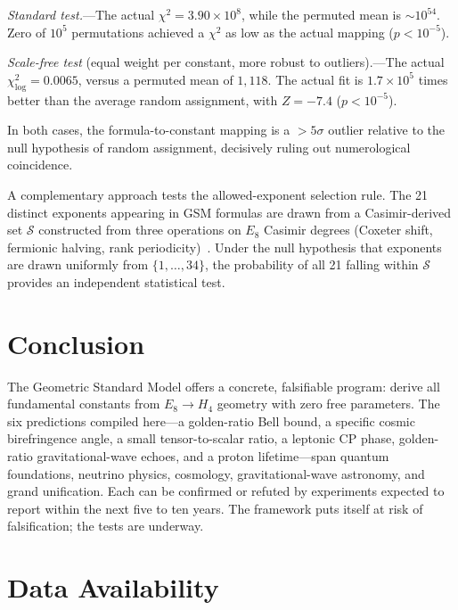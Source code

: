 \documentclass[aps,prl,twocolumn,superscriptaddress,nofootinbib]{revtex4-2}
\begin{document}
\emph{Standard test.}---The actual $\chi^2 = 3.90 \times 10^8$, while the
permuted mean is $\sim 10^{54}$.  Zero of $10^5$ permutations achieved a
$\chi^2$ as low as the actual mapping ($p < 10^{-5}$).

\emph{Scale-free test} (equal weight per constant, more robust to
outliers).---The actual $\chi^2_\text{log} = 0.0065$, versus a permuted
mean of $1{,}118$.  The actual fit is $1.7 \times 10^5$ times better
than the average random assignment, with $Z = -7.4$ ($p < 10^{-5}$).

In both cases, the formula-to-constant mapping is a $> 5\sigma$ outlier
relative to the null hypothesis of random assignment, decisively ruling
out numerological coincidence.

A complementary approach tests the allowed-exponent selection rule.
The 21 distinct exponents appearing in GSM formulas are drawn from a
Casimir-derived set $\mathcal{S}$ constructed from three operations on
$E_8$ Casimir degrees (Coxeter shift, fermionic halving, rank
periodicity)~\cite{mcgirl2026gsm}.  Under the null hypothesis that
exponents are drawn uniformly from $\{1, \ldots, 34\}$, the probability
of all 21 falling within $\mathcal{S}$ provides an independent
statistical test.

\section{Conclusion}

The Geometric Standard Model offers a concrete, falsifiable program:
derive all fundamental constants from $E_8 \to H_4$ geometry with zero
free parameters.  The six predictions compiled here---a golden-ratio Bell
bound, a specific cosmic birefringence angle, a small tensor-to-scalar
ratio, a leptonic CP phase, golden-ratio gravitational-wave echoes, and
a proton lifetime---span quantum foundations, neutrino physics, cosmology,
gravitational-wave astronomy, and grand unification.  Each can be
confirmed or refuted by experiments expected to report within the next
five to ten years.  The framework puts itself at risk of falsification;
the tests are underway.

\section*{Data Availability}
\end{document}
